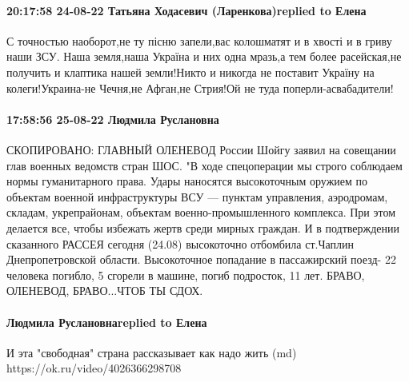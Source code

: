 \paragraph{20:17:58 24-08-22 Татьяна Ходасевич (Ларенкова)replied to Елена}

С точностью наоборот,не ту пісню запели,вас колошматят и в хвості и в гриву
наши ЗСУ. Наша земля,наша Україна и них одна мразь,а тем более расейская,не
получить и клаптика нашей земли!Никто и никогда не поставит Україну на
колеги!Украина-не Чечня,не Афган,не Стрия!Ой не туда поперли-асвабадители!

\paragraph{17:58:56 25-08-22 Людмила Руслановна}

СКОПИРОВАНО: ГЛАВНЫЙ ОЛЕНЕВОД России Шойгу заявил на совещании глав военных
ведомств стран ШОС. "В ходе спецоперации мы строго соблюдаем нормы
гуманитарного права. Удары наносятся высокоточным оружием по объектам военной
инфраструктуры ВСУ — пунктам управления, аэродромам, складам, укрепрайонам,
объектам военно-промышленного комплекса. При этом делается все, чтобы избежать
жертв среди мирных граждан. И в подтверждении сказанного РАССЕЯ сегодня (24.08)
высокоточно отбомбила ст.Чаплин Днепропетровской области. Высокоточное
попадание в пассажирский поезд- 22 человека погибло, 5 сгорели в машине, погиб
подросток, 11 лет. БРАВО, ОЛЕНЕВОД, БРАВО...ЧТОБ ТЫ СДОХ.

\paragraph{Людмила Руслановнаreplied to Елена}

И эта "свободная" страна рассказывает как надо жить (md)
https://ok.ru/video/4026366298708
